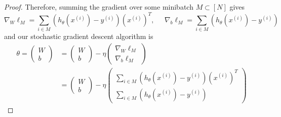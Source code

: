 \begin{proof}
    Therefore, summing the gradient over some minibatch $M \subset [N]$ gives 
    \begin{equation}
      \nabla_{W} \ell_M = \sum_{i \in M} (h_{\theta}(x^{(i)}) - y^{(i)}) (x^{(i)})^T, \;\;\;\;\; \nabla_{b} \ell_M = \sum_{i \in M} (h_{\theta}(x^{(i)}) - y^{(i)})
    \end{equation}
    and our stochastic gradient descent algorithm is 
    \begin{align*}
      \theta = \begin{pmatrix} W \\ b \end{pmatrix} & = \begin{pmatrix} W \\ b \end{pmatrix} - \eta \begin{pmatrix} \nabla_{W} \ell_M \\ \nabla_{b} \ell_M \end{pmatrix} \\
      & = \begin{pmatrix} W \\ b \end{pmatrix} - \eta \begin{pmatrix} \sum_{i \in M} (h_{\theta}(x^{(i)}) - y^{(i)}) (x^{(i)})^T \\ \sum_{i \in M} (h_{\theta}(x^{(i)}) - y^{(i)}) \end{pmatrix} 
    \end{align*}
  \end{proof}

